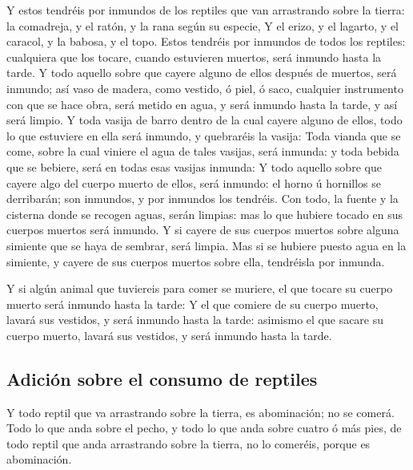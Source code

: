  Y estos tendréis por inmundos de los reptiles que van
arrastrando sobre la tierra: la comadreja, y el ratón, y la rana según
su especie,  Y el erizo, y el lagarto, y el caracol, y la
babosa, y el topo.  Estos tendréis por inmundos de todos
los reptiles: cualquiera que los tocare, cuando estuvieren muertos, será
inmundo hasta la tarde.  Y todo aquello sobre que cayere
alguno de ellos después de muertos, será inmundo; así vaso de madera,
como vestido, ó piel, ó saco, cualquier instrumento con que se hace
obra, será metido en agua, y será inmundo hasta la tarde, y así será
limpio.  Y toda vasija de barro dentro de la cual cayere
alguno de ellos, todo lo que estuviere en ella será inmundo, y
quebraréis la vasija:  Toda vianda que se come, sobre la
cual viniere el agua de tales vasijas, será inmunda: y toda bebida que
se bebiere, será en todas esas vasijas inmunda:  Y todo
aquello sobre que cayere algo del cuerpo muerto de ellos, será inmundo:
el horno ú hornillos se derribarán; son inmundos, y por inmundos los
tendréis.  Con todo, la fuente y la cisterna donde se
recogen aguas, serán limpias: mas lo que hubiere tocado en sus cuerpos
muertos será inmundo.  Y si cayere de sus cuerpos muertos
sobre alguna simiente que se haya de sembrar, será limpia.
 Mas si se hubiere puesto agua en la simiente, y cayere
de sus cuerpos muertos sobre ella, tendréisla por inmunda.

 Y si algún animal que tuviereis para comer se muriere,
el que tocare su cuerpo muerto será inmundo hasta la tarde:
 Y el que comiere de su cuerpo muerto, lavará sus
vestidos, y será inmundo hasta la tarde: asimismo el que sacare su
cuerpo muerto, lavará sus vestidos, y será inmundo hasta la tarde.

\hypertarget{adiciuxf3n-sobre-el-consumo-de-reptiles}{%
\subsection{Adición sobre el consumo de
reptiles}\label{adiciuxf3n-sobre-el-consumo-de-reptiles}}

 Y todo reptil que va arrastrando sobre la tierra, es
abominación; no se comerá.  Todo lo que anda sobre el
pecho, y todo lo que anda sobre cuatro ó más pies, de todo reptil que
anda arrastrando sobre la tierra, no lo comeréis, porque es abominación.

